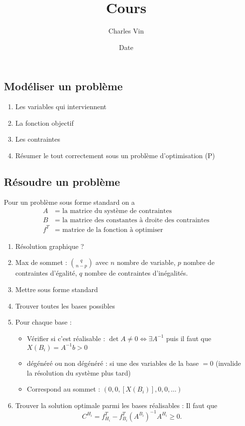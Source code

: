 \documentclass{article}
\title{Cours}
\author{Charles Vin}
\date{Date}
\theoremstyle{plain}%
\theoremstyle{definition}
\theoremstyle{remark}
\begin{document}
\maketitle

\subsection{Modéliser un problème}
\begin{enumerate}
    \item Les variables qui interviennent
    \item La fonction objectif
    \item Les contraintes
    \item Résumer le tout correctement sous un problème d'optimisation (P)
\end{enumerate}

\subsection{Résoudre un problème}
Pour un problème sous forme standard on a 
\begin{align*}
    A &= \text{ la matrice du système de contraintes} \\ 
    B &= \text{ la matrice des constantes à droite des contraintes} \\
    f^T &= \text{ matrice de la fonction à optimiser}
\end{align*}

\begin{enumerate}
    \item Résolution graphique ?
    \item Max de sommet : $ \binom{q}{n-p} $ avec $ n $ nombre de variable, $ p $ nombre de contraintes d'égalité, $ q $ nombre de contraintes d'inégalités.
    \item Mettre sous forme standard 
    \item Trouver toutes les bases possibles
    \item Pour chaque base : \begin{itemize}
        \item Vérifier si c'est réalisable : $ \det A \neq 0 \Leftrightarrow \exists A^{-1} $ puis il faut que $ X(B_i) = A^{-1}b > 0 $
        \item dégénéré ou non dégénéré : si une des variables de la base $ =0 $ (invalide la résolution du système plus tard)
        \item Correspond au sommet : $ (0,0, [X(B_i)], 0, 0, \dots) $ 
    \end{itemize}
    \item Trouver la solution optimale parmi les bases réalisables : Il faut que 
    \[
        C^{H_i} = f^T_{H_i} - f^T_{B_i} (A^{B_i})^{-1} A^{H_i} \geq 0
    .\]
\end{enumerate}
\end{document}
